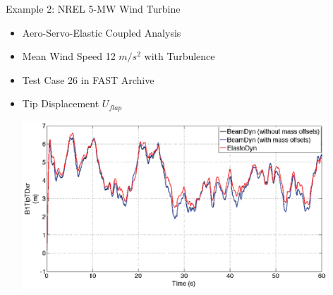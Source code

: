 \documentclass[xcolor=cmyk]{beamer}
\begin{document}
\begin{frame}{Example 2: NREL 5-MW Wind Turbine}
    \begin{itemize}
        \item
        Aero-Servo-Elastic Coupled Analysis
        \item 
        Mean Wind Speed 12 $m/s^2$ with Turbulence
        \item
        Test Case 26 in FAST Archive
        
         \item Tip Displacement $U_{flap}$
         \begin{center}
         \includegraphics[width=4.5in]{EPSF/B1TipTDxr.eps}
         \end{center}
    \end{itemize}
\end{frame}
\end{document}
